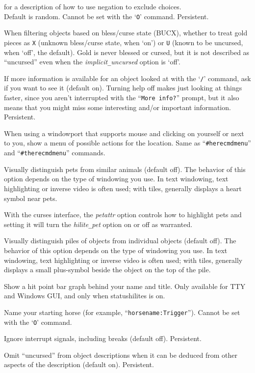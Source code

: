 for a description of how to use negation to exclude choices.
\\
Default is random.
Cannot be set with the `{\tt O}' command.  Persistent.
\item[\ib{goldX}]
When filtering objects based on bless/curse state (BUCX), whether to
treat gold pieces as {\tt X} (unknown bless/curse state, when `on')
or {\tt U} (known to be uncursed, when `off', the default).
Gold is never blessed or cursed, but it is not described as ``uncursed''
even when the {\it implicit\verb+_+uncursed\/} option is `off'.
\item[\ib{help}]
If more information is available for an object looked at
with the `{\tt /}' command, ask if you want to see it (default on).
Turning help off makes just looking at things faster, since you aren't
interrupted with the ``{\tt More info?}'' prompt, but it also means that you
might miss some interesting and/or important information.  Persistent.
\item[\ib{herecmd\verb+_+menu}]
When using a windowport that supports mouse and clicking on yourself or
next to you, show a menu of possible actions for the location.
Same as ``{\tt \#herecmdmenu}'' and ``{\tt \#therecmdmenu}'' commands.
\item[\ib{hilite\verb+_+pet}]
Visually distinguish pets from similar animals (default off).
The behavior of this option depends on the type of windowing you use.
In text windowing, text highlighting or inverse video is often used;
with tiles, generally displays a heart symbol near pets.

With the curses interface, the {\it petattr\/}
option controls how to highlight pets and setting it will turn the
{\it hilite\verb+_+pet\/} option on or off as warranted.
\item[\ib{hilite\verb+_+pile}]
Visually distinguish piles of objects from individual objects (default off).
The behavior of this option depends on the type of windowing you use.
In text windowing, text highlighting or inverse video is often used;
with tiles, generally displays a small plus-symbol beside the object
on the top of the pile.
\item[\ib{hitpointbar}]
Show a hit point bar graph behind your name and title.
Only available for TTY and Windows GUI, and only when statushilites is on.
\item[\ib{horsename}]
Name your starting horse (for example, ``{\tt horsename:Trigger}'').
Cannot be set with the `{\tt O}' command.
\item[\ib{ignintr}]
Ignore interrupt signals, including breaks (default off).  Persistent.
\item[\ib{implicit\verb+_+uncursed}]
Omit ``uncursed'' from object descriptions when it can be deduced from
other aspects of the description (default on).
Persistent.

